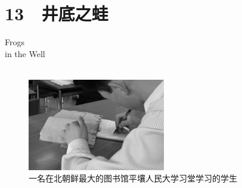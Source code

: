 \fancyhead[RO]{{\tiny{\textcolor{Gray}{\FA \ }}}\thepage}
\fancyhead[LE]{{\tiny{\textcolor{Gray}{\FA \ }}}\thepage}
\fancyfoot[LE,RO]{}
\fancyfoot[LO,CE]{}
\fancyfoot[CO,RE]{}
\chapter*{13 {\FA } 井底之蛙}
\vspace{15mm}
\begin{flushright}
	\textcolor{PinYinColor}{\EN \huge{Frogs\\
	in the Well\\
	\ \\}}
\end{flushright}

\begin{figure}[!htbp]
	\centering
	\includegraphics[width=6cm]{./Chapters/Images/13.jpg}
	\caption*{一名在北朝鲜最大的图书馆平壤人民大学习堂学习的学生}
\end{figure}

